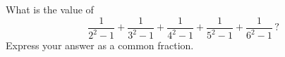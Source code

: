 What is the value of
\[
\dfrac{1}{2^2-1}+\dfrac{1}{3^2-1}+\dfrac{1}{4^2-1}+\dfrac{1}{5^2-1}+\dfrac{1}{6^2-1}\,?
\]
Express your answer as a common fraction.
